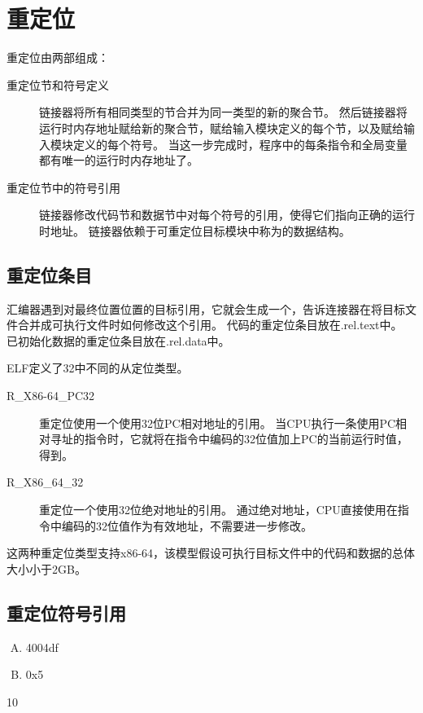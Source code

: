
\section{重定位}
{
    重定位由两部组成：

    \begin{description}
        \item[重定位节和符号定义]
        {
            链接器将所有相同类型的节合并为同一类型的新的聚合节。
            然后链接器将运行时内存地址赋给新的聚合节，赋给输入模块定义的每个节，以及赋给输入模块定义的每个符号。
            当这一步完成时，程序中的每条指令和全局变量都有唯一的运行时内存地址了。
        }
        \item[重定位节中的符号引用]
        {
            链接器修改代码节和数据节中对每个符号的引用，使得它们指向正确的运行时地址。
            链接器依赖于可重定位目标模块中称为的数据结构。
        }
    \end{description}

    \subsection{重定位条目}
    {
        汇编器遇到对最终位置位置的目标引用，它就会生成一个，告诉连接器在将目标文件合并成可执行文件时如何修改这个引用。
        代码的重定位条目放在.rel.text中。
        已初始化数据的重定位条目放在.rel.data中。

        ELF定义了32中不同的从定位类型。

        \begin{description}
            \item[R_X86-64_PC32]
            {
                重定位使用一个使用32位PC相对地址的引用。
                当CPU执行一条使用PC相对寻址的指令时，它就将在指令中编码的32位值加上PC的当前运行时值，得到。
            }
            \item[R_X86_64_32]
            {
                重定位一个使用32位绝对地址的引用。
                通过绝对地址，CPU直接使用在指令中编码的32位值作为有效地址，不需要进一步修改。
            }
        \end{description}

        这两种重定位类型支持x86-64，该模型假设可执行目标文件中的代码和数据的总体大小小于2GB。
    }

    \subsection{重定位符号引用}
    {
        \begin{practicec}
            \begin{enumerate}[A.]
                \item 4004df
                \item 0x5
            \end{enumerate}
        \end{practicec}

        \begin{practicec}
            10
        \end{practicec}
    }
}
